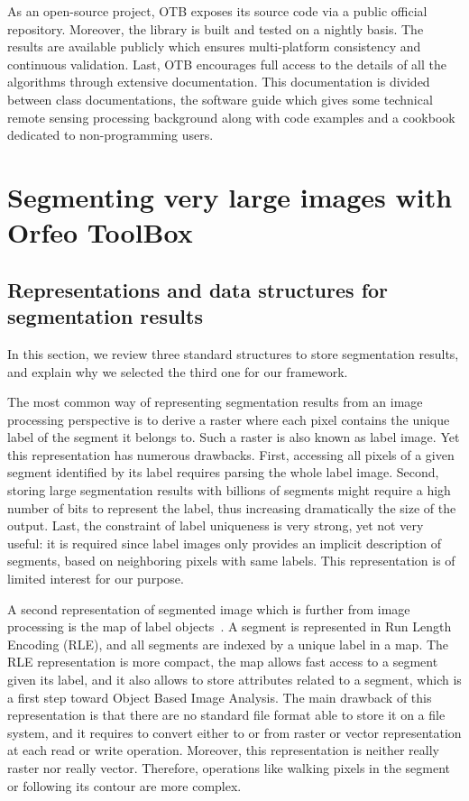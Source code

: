 \documentclass{josis}
\begin{document}
As an open-source project, OTB exposes its source code via a public
official repository. Moreover, the library is built and tested on a
nightly basis. The results are available publicly which ensures
multi-platform consistency and continuous validation. Last, OTB
encourages full access to the details of all the algorithms through
extensive documentation. This documentation is divided between class
documentations, the software guide\cite{otbSoftwareGuide} which gives
some technical remote sensing processing background along with code
examples and a cookbook~\cite{otbCookBook} dedicated to non-programming
users.

\section{Segmenting very large images with Orfeo ToolBox}


\subsection{Representations and data structures for segmentation results}

In this section, we review three standard structures to store
segmentation results, and explain why we selected the third one for
our framework.

The most common way of representing segmentation results from an image
processing perspective is to derive a raster where each pixel contains
the unique label of the segment it belongs to. Such a raster is also
known as label image. Yet this representation has numerous
drawbacks. First, accessing all pixels of a given segment identified
by its label requires parsing the whole label image. Second, storing
large segmentation results with billions of segments might require a
high number of bits to represent the label, thus increasing
dramatically the size of the output. Last, the constraint of label
uniqueness is very strong, yet not very useful: it is required since
label images only provides an implicit description of segments, based
on neighboring pixels with same labels. This representation is of
limited interest for our purpose.

A second representation of segmented image which is further from image
processing is the map of label objects~\cite{lehmann2008label}. A
segment is represented in Run Length Encoding (RLE), and all segments
are indexed by a unique label in a map. The RLE representation is more
compact, the map allows fast access to a segment given its label, and
it also allows to store attributes related to a segment, which is a
first step toward Object Based Image Analysis. The main drawback of
this representation is that there are no standard file format able to
store it on a file system, and it requires to convert either to or
from raster or vector representation at each read or write
operation. Moreover, this representation is neither really raster nor
really vector. Therefore, operations like walking pixels in the
segment or following its contour are more complex.
\end{document}
